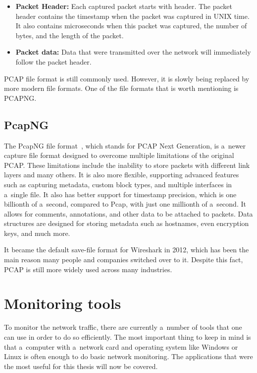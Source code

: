 \documentclass[
  printed,     %
  color,       %
  oneside,     %
  nosansbold,  %
  nocolorbold, %
  nolof,         %
  nolot,         %
]{fithesis4}
\begin{document}
\begin{itemize}
    \item \textbf{Packet Header:} Each captured packet starts with header. The packet header contains the timestamp when the packet was captured in UNIX time. It also contains microseconds when this packet was captured, the number of bytes, and the length of the packet.
    \item \textbf{Packet data:} Data that were transmitted over the network will immediately follow the packet header.
\end{itemize}

PCAP file format is still commonly used. However, it is slowly being replaced by more modern file formats. One of the file formats that is worth mentioning is PCAPNG.

\subsection{PcapNG}

The PcapNG file format~\cite{PcapNg85:online}, which stands for PCAP Next Generation, is a~newer capture file format designed to overcome multiple limitations of the original PCAP. These limitations include the inability to store packets with different link layers and many others. It is also more flexible, supporting advanced features such as capturing metadata, custom block types, and multiple interfaces in a~single file. It also has better support for timestamp precision, which is one billionth of a~second, compared to Pcap, with just one millionth of a~second. It allows for comments, annotations, and other data to be attached to packets. Data structures are designed for storing metadata such as hostnames, even encryption keys, and much more. 

It became the default save-file format for Wireshark in 2012, which has been the main reason many people and companies switched over to it. Despite this fact, PCAP is still more widely used across many industries.

\section{Monitoring tools}

To monitor the network traffic, there are currently a~number of tools that one can use in order to do so efficiently. The most important thing to keep in mind is that a~computer with a~network card and operating system like Windows or Linux is often enough to do basic network monitoring. The applications that were the most useful for this thesis will now be covered.
\end{document}

